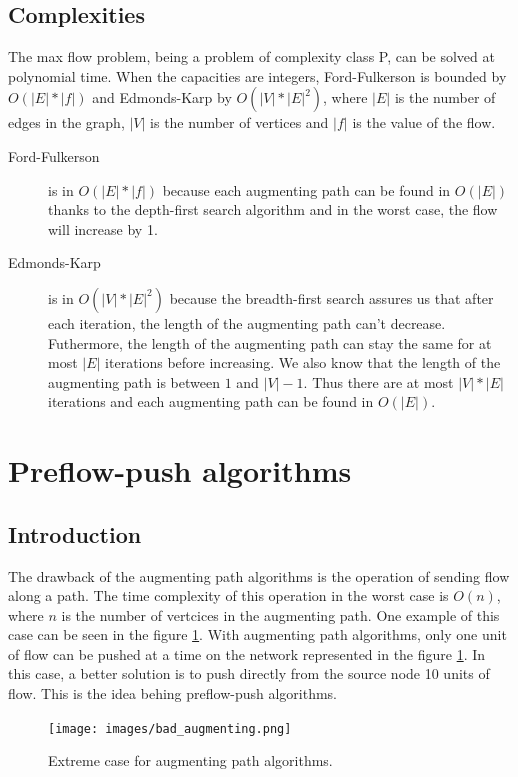 \subsection{Complexities}
The max flow problem, being a problem of complexity class P, can be solved at polynomial time. When the capacities are integers, Ford-Fulkerson is bounded by $O(|E|*|f|)$ and Edmonds-Karp by $O(|V|*|E|^2)$, where $|E|$ is the number of edges in the graph, $|V|$ is the number of vertices and $|f|$ is the value of the flow.

\begin{description}
\item[Ford-Fulkerson]{is in $O(|E|*|f|)$ because each augmenting path can be found in $O(|E|)$ thanks to the depth-first search algorithm and in the worst case, the flow will increase by 1.}
\item[Edmonds-Karp]{is in $O(|V|*|E|^2)$ because the breadth-first search assures us that after each iteration, the length of the augmenting path can't decrease. Futhermore, the length of the augmenting path can stay the same for at most $|E|$ iterations before increasing. We also know that the length of the augmenting path is between $1$ and $|V|-1$. Thus there are at most $|V|*|E|$ iterations and each augmenting path can be found in $O(|E|)$.}
\end{description}


\section{Preflow-push algorithms}

\subsection{Introduction}

The drawback of the augmenting path algorithms is the operation of sending flow along a path. The time complexity of this operation in the worst case is $O(n)$, where $n$ is the number of vertcices in the augmenting path. One example of this case can be seen in the figure \ref{img:bad_augmenting}. With augmenting path algorithms, only one unit of flow can be pushed at a time on the network represented in the figure \ref{img:bad_augmenting}. In this case, a better solution is to push directly from the source node 10 units of flow. This is the idea behing preflow-push algorithms.

\begin{figure}
\centering
\texttt{[image: images/bad\_augmenting.png]}
\caption{Extreme case for augmenting path algorithms.}
\label{img:bad_augmenting}
\end{figure}


